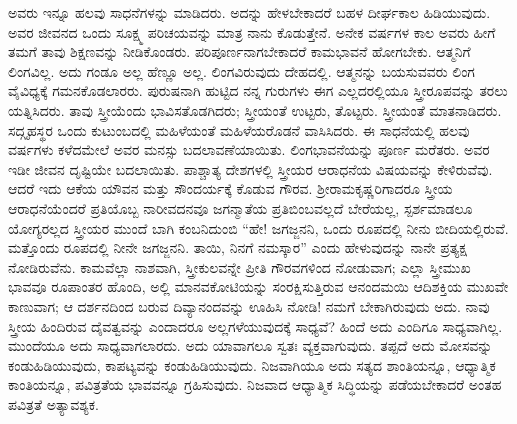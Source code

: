 ಅವರು ಇನ್ನೂ ಹಲವು ಸಾಧನೆಗಳನ್ನು ಮಾಡಿದರು. ಅದನ್ನು ಹೇಳಬೇಕಾದರೆ ಬಹಳ ದೀರ್ಘಕಾಲ ಹಿಡಿಯುವುದು. ಅವರ ಜೀವನದ ಒಂದು ಸೂಕ್ಷ್ಮ ಪರಿಚಯವನ್ನು ಮಾತ್ರ ನಾನು ಕೊಡುತ್ತೇನೆ. ಅನೇಕ ವರ್ಷಗಳ ಕಾಲ ಅವರು ಹೀಗೆ ತಮಗೆ ತಾವು ಶಿಕ್ಷಣವನ್ನು ನೀಡಿಕೊಂಡರು. ಪರಿಪೂರ್ಣನಾಗಬೇಕಾದರೆ ಕಾಮಭಾವನೆ ಹೋಗಬೇಕು. ಆತ್ಮನಿಗೆ ಲಿಂಗವಿಲ್ಲ. ಅದು ಗಂಡೂ ಅಲ್ಲ ಹೆಣ್ಣೂ ಅಲ್ಲ. ಲಿಂಗವಿರುವುದು ದೇಹದಲ್ಲಿ. ಆತ್ಮನನ್ನು ಬಯಸುವವರು ಲಿಂಗ ವೈವಿಧ್ಯಕ್ಕೆ ಗಮನಕೊಡಲಾರರು. ಪುರುಷನಾಗಿ ಹುಟ್ಟಿದ ನನ್ನ ಗುರುಗಳು ಈಗ ಎಲ್ಲದರಲ್ಲಿಯೂ ಸ್ತ್ರೀರೂಪವನ್ನು ತರಲು ಯತ್ನಿಸಿದರು. ತಾವು ಸ್ತ್ರೀಯೆಂದು ಭಾವಿಸತೊಡಗಿದರು; ಸ್ತ್ರೀಯಂತೆ ಉಟ್ಟರು, ತೊಟ್ಟರು. ಸ್ತ್ರೀಯಂತೆ ಮಾತನಾಡಿದರು. ಸದ್ಗೃಹಸ್ಥರ ಒಂದು ಕುಟುಂಬದಲ್ಲಿ ಮಹಿಳೆಯಂತೆ ಮಹಿಳೆಯರೊಡನೆ ವಾಸಿಸಿದರು. ಈ ಸಾಧನೆಯಲ್ಲಿ ಹಲವು ವರ್ಷಗಳು ಕಳೆದಮೇಲೆ ಅವರ ಮನಸ್ಸು ಬದಲಾವಣೆಯಾಯಿತು. ಲಿಂಗಭಾವನೆಯನ್ನು ಪೂರ್ಣ ಮರೆತರು. ಅವರ ಇಡೀ ಜೀವನ ದೃಷ್ಟಿಯೇ ಬದಲಾಯಿತು. ಪಾಶ್ಚಾತ್ಯ ದೇಶಗಳಲ್ಲಿ ಸ್ತ್ರೀಯರ ಆರಾಧನೆಯ ವಿಷಯವನ್ನು ಕೇಳಿರುವೆವು. ಆದರೆ ಇದು ಆಕೆಯ ಯೌವನ ಮತ್ತು ಸೌಂದರ್ಯಕ್ಕೆ ಕೊಡುವ ಗೌರವ. ಶ‍್ರೀರಾಮಕೃಷ್ಣರಿಗಾದರೂ ಸ್ತ್ರೀಯ ಆರಾಧನೆಯೆಂದರೆ ಪ್ರತಿಯೊಬ್ಬ ನಾರೀವದನವೂ ಜಗನ್ಮಾತೆಯ ಪ್ರತಿಬಿಂಬವಲ್ಲದೆ ಬೇರೆಯಲ್ಲ, ಸ್ಪರ್ಶಮಾಡಲೂ ಯೋಗ್ಯರಲ್ಲದ ಸ್ತ್ರೀಯರ ಮುಂದೆ ಬಾಗಿ ಕಂಬನಿದುಂಬಿ “ಹೇ! ಜಗಜ್ಜನನಿ, ಒಂದು ರೂಪದಲ್ಲಿ ನೀನು ಬೀದಿಯಲ್ಲಿರುವೆ. ಮತ್ತೊಂದು ರೂಪದಲ್ಲಿ ನೀನೇ ಜಗಜ್ಜನನಿ. ತಾಯಿ, ನಿನಗೆ ನಮಸ್ಕಾರ” ಎಂದು ಹೇಳುವುದನ್ನು ನಾನೇ ಪ್ರತ್ಯಕ್ಷ ನೋಡಿರುವೆನು. ಕಾಮವೆಲ್ಲಾ ನಾಶವಾಗಿ, ಸ್ತ್ರೀಕುಲವನ್ನೇ ಪ್ರೀತಿ ಗೌರವಗಳಿಂದ ನೋಡುವಾಗ; ಎಲ್ಲಾ ಸ್ತ್ರೀಮುಖ ಭಾವವೂ ರೂಪಾಂತರ ಹೊಂದಿ, ಅಲ್ಲಿ ಮಾನವಕೋಟಿಯನ್ನು ಸಂರಕ್ಷಿಸುತ್ತಿರುವ ಆನಂದಮಯಿ ಆದಿಶಕ್ತಿಯ ಮುಖವೇ ಕಾಣುವಾಗ; ಆ ದರ್ಶನದಿಂದ ಬರುವ ದಿವ್ಯಾನಂದವನ್ನು ಊಹಿಸಿ ನೋಡಿ! ನಮಗೆ ಬೇಕಾಗಿರುವುದು ಅದು. ನಾವು ಸ್ತ್ರೀಯ ಹಿಂದಿರುವ ದೈವತ್ವವನ್ನು ಎಂದಾದರೂ ಅಲ್ಲಗಳೆಯುವುದಕ್ಕೆ ಸಾಧ್ಯವೆ? ಹಿಂದೆ ಅದು ಎಂದಿಗೂ ಸಾಧ್ಯವಾಗಿಲ್ಲ. ಮುಂದೆಯೂ ಅದು ಸಾಧ್ಯವಾಗಲಾರದು. ಅದು ಯಾವಾಗಲೂ ಸ್ವತಃ ವ್ಯಕ್ತವಾಗುವುದು. ತಪ್ಪದೆ ಅದು ಮೋಸವನ್ನು ಕಂಡುಹಿಡಿಯುವುದು, ಕಾಪಟ್ಯವನ್ನು ಕಂಡುಹಿಡಿಯುವುದು. ನಿಜವಾಗಿಯೂ ಅದು ಸತ್ಯದ ಶಾಂತಿಯನ್ನೂ, ಆಧ್ಯಾತ್ಮಿಕ ಕಾಂತಿಯನ್ನೂ, ಪವಿತ್ರತೆಯ ಭಾವವನ್ನೂ ಗ್ರಹಿಸುವುದು. ನಿಜವಾದ ಆಧ್ಯಾತ್ಮಿಕ ಸಿದ್ಧಿಯನ್ನು ಪಡೆಯಬೇಕಾದರೆ ಅಂತಹ ಪವಿತ್ರತೆ ಅತ್ಯಾವಶ್ಯಕ.

